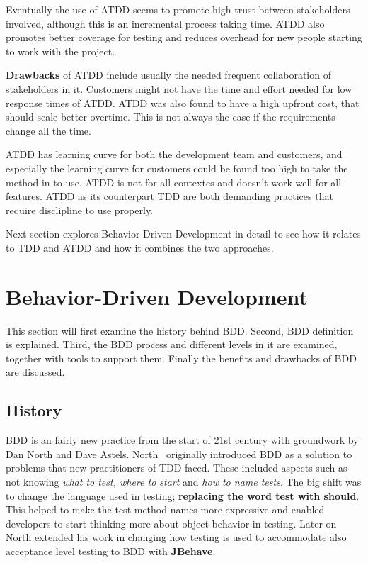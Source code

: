     Eventually the use of ATDD seems to promote high trust between stakeholders involved, although
    this is an incremental process taking time. ATDD also promotes better coverage for testing
    and reduces overhead for new people starting to work with the project. ~\cite{haugset2012automated}

    \textbf{Drawbacks} of ATDD include usually the needed frequent collaboration of stakeholders in it. Customers
    might not have the time and effort needed for low response times of ATDD. ATDD was also found to have a high
    upfront cost, that should scale better overtime. This is not always the case if the requirements change all the time. ~\cite{haugset2012automated}

    ATDD has learning curve for both the development team and customers, and especially the learning curve for customers
    could be found too high to take the method in to use. ATDD is not for all contextes and doesn't work well for all features.
    ATDD as its counterpart TDD are both demanding practices that require
    disclipline to use properly.~\cite{haugset2012automated}

    Next section explores Behavior-Driven Development
    in detail to see how it relates to TDD and ATDD and how it combines the two approaches.
\clearpage
\section{Behavior-Driven Development} %
    This section will first examine the history behind BDD. Second, BDD definition is explained.
    Third, the BDD process and different levels in it are examined, together with tools to support them. Finally
    the benefits and drawbacks of BDD are discussed.

    \subsection{History}
    BDD is an fairly new practice from the start of 21st century with groundwork by Dan North and Dave Astels.
    North~\cite{bdd2006north} originally introduced BDD as a solution to problems that new practitioners of TDD faced.
    These included aspects such as not knowing \textit{what to test, where to start} and \textit{how to name tests}. The
    big shift was to change the language used in testing; \textbf{replacing the word test with should}. This helped to make
    the test method names more expressive and enabled developers to start thinking more about object behavior in testing.
    Later on North extended his work in changing how testing is used to accommodate also acceptance level testing to BDD with \textbf{JBehave}.

